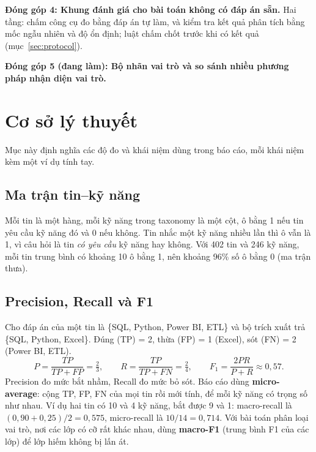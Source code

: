 \documentclass[12pt]{article}
\begin{document}
\textbf{Đóng góp 4: Khung đánh giá cho bài toán không có đáp án sẵn.} Hai tầng: chấm công cụ đo bằng đáp án tự làm, và kiểm tra kết quả phân tích bằng mốc ngẫu nhiên và độ ổn định; luật chấm chốt trước khi có kết quả (mục~\ref{sec:protocol}).

\textbf{Đóng góp 5 (đang làm): Bộ nhãn vai trò và so sánh nhiều phương pháp nhận diện vai trò.}

\newpage
\section{Cơ sở lý thuyết}
Mục này định nghĩa các độ đo và khái niệm dùng trong báo cáo, mỗi khái niệm kèm một ví dụ tính tay.

\subsection{Ma trận tin--kỹ năng}
\label{sec:matrix}

Mỗi tin là một hàng, mỗi kỹ năng trong taxonomy là một cột, ô bằng 1 nếu tin yêu cầu kỹ năng đó và 0 nếu không. Tin nhắc một kỹ năng nhiều lần thì ô vẫn là 1, vì câu hỏi là tin \textit{có yêu cầu} kỹ năng hay không. Với 402 tin và 246 kỹ năng, mỗi tin trung bình có khoảng 10 ô bằng 1, nên khoảng 96\% số ô bằng 0 (ma trận thưa).

\subsection{Precision, Recall và F1}

Cho đáp án của một tin là \{SQL, Python, Power BI, ETL\} và bộ trích xuất trả \{SQL, Python, Excel\}. Đúng (TP) = 2, thừa (FP) = 1 (Excel), sót (FN) = 2 (Power BI, ETL).
\begin{equation}
P = \frac{TP}{TP + FP} = \tfrac{2}{3},\qquad R = \frac{TP}{TP + FN} = \tfrac{2}{4},\qquad F_1 = \frac{2PR}{P + R} \approx 0{,}57.
\end{equation}
Precision đo mức bắt nhầm, Recall đo mức bỏ sót. Báo cáo dùng \textbf{micro-average}: cộng TP, FP, FN của mọi tin rồi mới tính, để mỗi kỹ năng có trọng số như nhau. Ví dụ hai tin có 10 và 4 kỹ năng, bắt được 9 và 1: macro-recall là $(0{,}90 + 0{,}25)/2 = 0{,}575$, micro-recall là $10/14 = 0{,}714$. Với bài toán phân loại vai trò, nơi các lớp có cỡ rất khác nhau, dùng \textbf{macro-F1} (trung bình F1 của các lớp) để lớp hiếm không bị lấn át.
\end{document}
